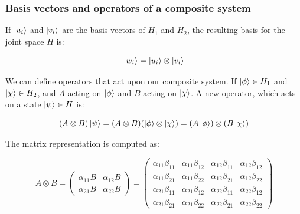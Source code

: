 \documentclass{beamer}
\begin{document}
\begin{frame}
	\frametitle{Basis vectors and operators of a composite system}
	If $\ket{u_i}$ and $\ket{v_i}$ are the basis vectors of $H_1$ and $H_2$, the resulting basis for the joint space $H$ is:
	
	\begin{equation}
		\ket{w_i} = \ket{u_i} \otimes \ket{v_i}
		\label{eq:wi}
	\end{equation}

	We can define operators that act upon our composite system. If $\ket{\phi} \in H_1$ and $\ket{\chi} \in H_2$, and $A$ acting on $\ket{\phi}$ and $B$ acting on $\ket{\chi}$. A new operator, which acts on a state $\ket{\psi} \in H$ is:
	
	\begin{equation}
		(A \otimes B) \ket{\psi} = (A \otimes B)(\ket{\phi} \otimes \ket{\chi}) = (A\ket{\phi}) \otimes (B\ket{\chi})
		\label{eq:comp_systems}
	\end{equation}
	
	The matrix representation is computed as:
	
	\begin{equation}
		A \otimes B 
		= 	\begin{pmatrix} 
			\alpha_{11}B &  \alpha_{12}B\\ 
			\alpha_{21}B &  \alpha_{22}B
		\end{pmatrix}  
		= 	\begin{pmatrix} 
			\alpha_{11}\beta_{11} &  \alpha_{11}\beta_{12} & \alpha_{12}\beta_{11} &\alpha_{12}\beta_{12}\\ 
			\alpha_{11}\beta_{21} &  \alpha_{11}\beta_{22} & \alpha_{12}\beta_{21} &\alpha_{12}\beta_{22}\\
			\alpha_{21}\beta_{11} &  \alpha_{21}\beta_{12} & \alpha_{22}\beta_{11} &\alpha_{22}\beta_{12}\\
			\alpha_{21}\beta_{21} &  \alpha_{21}\beta_{22} & \alpha_{22}\beta_{21} &\alpha_{22}\beta_{22}
		\end{pmatrix}
		\label{eq:comp_systems_matrix}
	\end{equation}
	
\end{frame}
\end{document}
